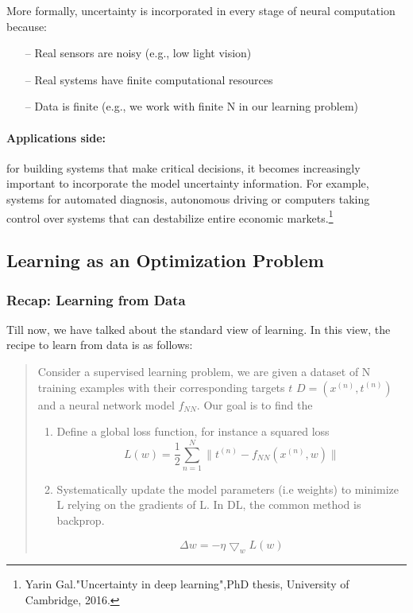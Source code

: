 \documentclass[main]{subfiles}
\begin{document}
    \noindent
    More formally, uncertainty is incorporated in every stage of neural computation because:
    \begin{itemize}
        \item[--] Real sensors are noisy (e.g., low light vision)
        \item[--] Real systems have finite computational resources
        \item[--] Data is finite (e.g., we work with finite N in our learning problem)
    \end{itemize}
    
    \paragraph{Applications side:} for building systems that make critical decisions, it becomes increasingly important to incorporate the model uncertainty information. For example, systems for automated diagnosis, autonomous driving or computers taking control over systems that can destabilize entire economic markets.\footnote{Yarin Gal."Uncertainty in deep learning",PhD thesis, University of Cambridge, 2016.}

\subsection{Learning as an Optimization Problem}
\subsubsection{Recap: Learning from Data}
Till now, we have talked about the standard view of learning. In this view, the recipe to learn from data is as follows:

\begin{quote}
    Consider a supervised learning problem, we are given a dataset of N training examples with their corresponding targets $t$ $D = {(x^{(n)}, t^{(n)})}$ and a neural network model $f_{NN}$. Our goal is to find the 
\begin{enumerate}
    \item Define a global loss function, for instance a squared loss
        \begin{equation}
            L(w) = \frac{1}{2} \sum_{n=1}^{N} \parallel t^{(n)} - f_{NN}(x^{(n)},w) \parallel
        \end{equation}
    \item Systematically update the model parameters (i.e weights) to minimize L relying on the gradients of L. In DL, the common method is backprop.
    
        \begin{equation}
            \Delta w = -\eta \bigtriangledown_w L(w)
        \end{equation}
    
\end{enumerate}
\end{quote}
\end{document}
